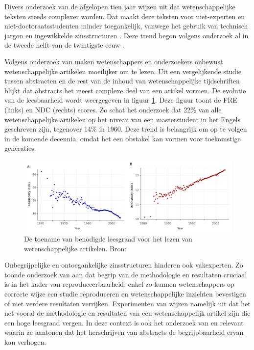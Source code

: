 Divers onderzoek van de afgelopen tien jaar wijzen uit dat wetenschappelijke teksten steeds complexer worden. Dat maakt deze teksten voor niet-experten en niet-doctoraatsstudenten minder toegankelijk, vanwege het gebruik van technisch jargon en ingewikkelde zinsstructuren \autocite{Ball2017, PlavenSigray2017, Jones2019}. Deze trend begon volgens onderzoek al in de tweede helft van de twintigste eeuw \autocite{Hayes1992}.

\medspace

Volgens onderzoek van \textcite{PlavenSigray2017} maken wetenschappers en onderzoekers onbewust wetenschappelijke artikelen moeilijker om te lezen. Uit een vergelijkende studie tussen abstracten en de rest van de inhoud van wetenschappelijke tijdschriften blijkt dat abstracts het meest complexe deel van een artikel vormen. De evolutie van de leesbaarheid wordt weergegeven in figuur \ref{img:fre-ndc}. Deze figuur toont de FRE (links) en NDC (rechts) scores. Zo schat het onderzoek dat 22\% van alle wetenschappelijke artikelen op het niveau van een masterstudent in het Engels geschreven zijn, tegenover 14\% in 1960. Deze trend is belangrijk om op te volgen in de komende decennia, omdat het een obstakel kan vormen voor toekomstige generaties.

\begin{figure}[H]
	\includegraphics[width=\linewidth]{img/fre-ndc.png}
	\caption{De toename van benodigde leesgraad voor het lezen van wetenschappelijke artikelen. Bron: \autocite{PlavenSigray2017}}
	\label{img:fre-ndc}
\end{figure}

Onbegrijpelijke en ontoegankelijke zinsstructuren hinderen ook vakexperten. Zo toonde onderzoek van \textcite{McNutt2014} aan dat begrip van de methodologie en resultaten cruciaal is in het kader van reproduceerbaarheid; enkel zo kunnen wetenschappers op correcte wijze een studie reproduceren en wetenschappelijke inzichten bevestigen of met verdere resultaten verrijken. Experimenten van \textcite{Hubbard2017} wijzen namelijk uit dat het net vooral de methodologie en resultaten van een wetenschappelijk artikel zijn die een hoge leesgraad vergen. In deze context is ook het onderzoek van \textcite{Hartley1999} en \textcite{Snow2010} relevant waarin ze aantonen dat het herschrijven van abstracts de begrijpbaarheid ervan kan verhogen.


